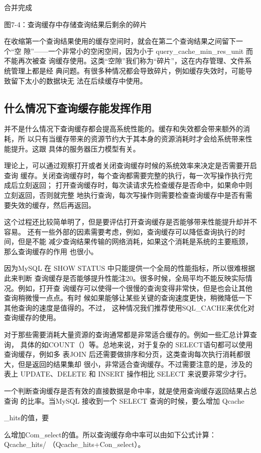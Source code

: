 合并完成

图7-4：查询缓存中存储查询结果后剩余的碎片

在收缩第一个查询结果使用的缓存空间时，就会在第二个查询结果之间留下一个“空
隙”——一个非常小的空闲空间，因为小于 query\_cache\_min\_res\_unit 而不能再次被查
询缓存使用。这类“空隙”我们称为“碎片”，这在内存管理、文件系统管理上都是经
典问题。有很多种情况都会导致碎片，例如缓存失效时，可能导致留下太小的数据块无
法在后续缓存中使用。

\subsection{什么情况下查询缓存能发挥作用}
并不是什么情况下查询缓存都会提高系统性能的。缓存和失效都会带来额外的消耗，所
以只有当缓存带来的资源节约大于其本身的资源消耗时才会给系统带来性能提升。这跟
具体的服务器压力模型有关。

理论上，可以通过观察打开或者关闭查询缓存时候的系统效率来决定是否需要开启查询
缓存。关闭查询缓存时，每个查询都需要完整的执行，每一次写操作执行完成后立刻返回；
打开查询缓存时，每次读请求先检查缓存是否命中，如果命中则立刻返回，否则就完整
地执行查询，每次写操作则需要检查查询缓存中是否有需要失效的缓存，然后再返回。

这个过程还比较简单明了，但是要评估打开查询缓存是否能够带来性能提升却并不容易。
还有一些外部的因素需要考虑，例如，查询缓存可以降低查询执行的时间，但是不能
减少查询结果传输的网络消耗，如果这个消耗是系统的主要瓶颈，那么查询缓存的作用
也很小。

因为MySQL 在 SHOW STATUS 中只能提供一个全局的性能指标，所以很难根据此来判断
查询缓存是否能够提升性能注20。很多时候，全局平均不能反映实际情况。例如，打开查
询缓存可以使得一个很慢的查询变得非常快，但是也会让其他查询稍微慢一点点。有时
候如果能够让某些关键的查询速度更快，稍微降低一下其他查询的速度是值得的。不过，
这种情况我们推荐使用SQL\_CACHE来优化对查询缓存的使用。

对于那些需要消耗大量资源的查询通常都是非常适合缓存的。例如一些汇总计算查询，
具体的如COUNT（）等。总地来说，对于复杂的 SELECT语句都可以使用查询缓存，例如多
表JOIN 后还需要做排序和分页，这类查询每次执行消耗都很大，但是返回的结果集却
很小，非常适合查询缓存。不过需要注意的是，涉及的表上 UPDATE、DELETE 和 INSERT
操作相比 SELECT 来说要非常少才行。

一个判断查询缓存是否有效的直接数据是命中率，就是使用查询缓存返回结果占总查询
的比率。当MySQL 接收到一个 SELECT 查询的时候，要么增加 Qcache

\_hits的值，要

么增加Com\_select的值。所以查询缓存命中率可以由如下公式计算：Qcache\_hits/
（Qcache\_hits+Con\_select）。

